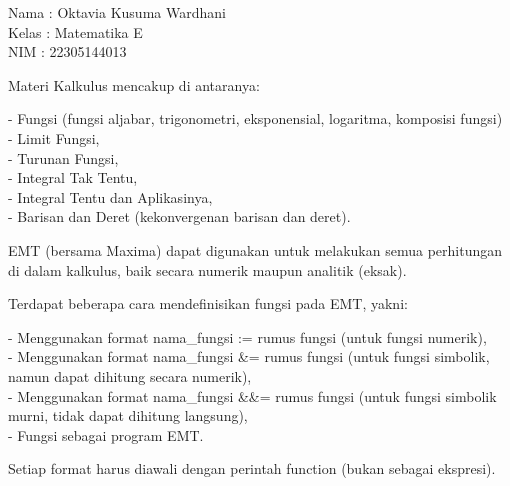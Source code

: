\documentclass{article}
\begin{document}
\begin{eulernotebook}
\begin{eulercomment}
Nama  : Oktavia Kusuma Wardhani\\
Kelas : Matematika E\\
NIM   : 22305144013

\end{eulercomment}
\eulersubheading{}
\begin{eulercomment}
Materi Kalkulus mencakup di antaranya:

- Fungsi (fungsi aljabar, trigonometri, eksponensial, logaritma,
komposisi fungsi)\\
- Limit Fungsi,\\
- Turunan Fungsi,\\
- Integral Tak Tentu,\\
- Integral Tentu dan Aplikasinya,\\
- Barisan dan Deret (kekonvergenan barisan dan deret).

EMT (bersama Maxima) dapat digunakan untuk melakukan semua perhitungan
di dalam kalkulus, baik secara numerik maupun analitik (eksak).

\end{eulercomment}
\begin{eulercomment}
Terdapat beberapa cara mendefinisikan fungsi pada EMT, yakni:

- Menggunakan format nama\_fungsi := rumus fungsi (untuk fungsi
numerik),\\
- Menggunakan format nama\_fungsi \&= rumus fungsi (untuk fungsi
simbolik, namun dapat dihitung secara numerik),\\
- Menggunakan format nama\_fungsi \&\&= rumus fungsi (untuk fungsi
simbolik murni, tidak dapat dihitung langsung),\\
- Fungsi sebagai program EMT.

Setiap format harus diawali dengan perintah function (bukan sebagai
ekspresi).


\end{eulercomment}
\end{eulernotebook}
\end{document}
